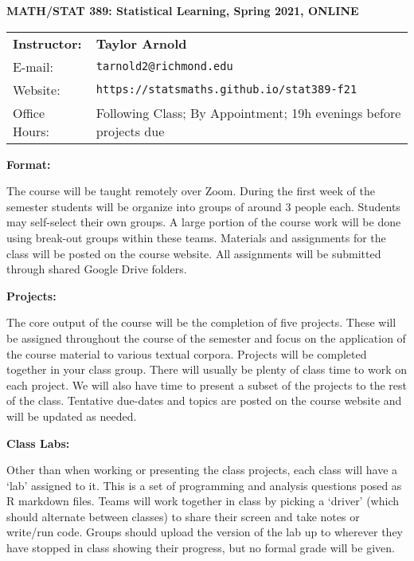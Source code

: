 \documentclass[12pt, a4paper]{article}
\begin{document}
\begin{center}
\textbf{MATH/STAT 389: Statistical Learning, Spring 2021, ONLINE}
\end{center}

\noindent
\begin{tabular}{ l l }
\textbf{Instructor:} &  \textbf{Taylor Arnold} \\
E-mail: & \texttt{tarnold2@richmond.edu} \\
Website: & \texttt{https://statsmaths.github.io/stat389-f21} \\
Office Hours: & Following Class; By Appointment; 19h evenings before projects due
\end{tabular}

\vspace{0.5cm}

\textbf{Format:} \vspace{6pt}

The course will be taught remotely over Zoom. During the first week of the
semester students will be organize into groups of around 3 people each.
Students may self-select their own groups. A large portion of the course work
will be done using break-out groups within these teams. Materials and
assignments for the class will be posted on the course website. All assignments
will be submitted through shared Google Drive folders.

\vspace{12pt}

\textbf{Projects:} \vspace{6pt}

The core output of the course will be the completion of five projects. These
will be assigned throughout the course of the semester and focus on the
application of the course material to various textual corpora. Projects will
be completed together in your class group. There will usually be plenty of
class time to work on each project. We will also have time to present a subset
of the projects to the rest of the class. Tentative due-dates and topics are
posted on the course website and will be updated as needed.

\vspace{12pt}

\textbf{Class Labs:} \vspace{6pt}

Other than when working or presenting the class projects, each class will have
a `lab' assigned to it. This is a set of programming and analysis questions
posed as R markdown files. Teams will work together in class by picking a
`driver' (which should alternate between classes) to share their screen and
take notes or write/run code. Groups should upload the version of the lab up to
wherever they have stopped in class showing their progress, but no formal grade
will be given.
\end{document}
